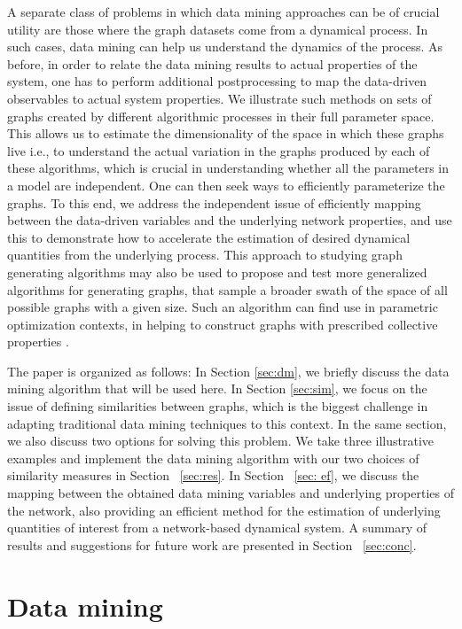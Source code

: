 A separate class of problems in which data mining approaches can be of
crucial utility are those where the graph datasets come from a
dynamical process. In such cases, data mining can help us understand
the dynamics of the process. As before, in order to relate the data
mining results to actual properties of the system, one has to perform
additional postprocessing to map the data-driven observables to actual
system properties.
% 
We illustrate such methods on sets of graphs created by different
algorithmic processes in their full parameter space. This allows us to
estimate the dimensionality of the space in which these graphs live
i.e., to understand the actual variation in the graphs produced by
each of these algorithms, which is crucial in understanding whether
all the parameters in a model are independent.
% 
One can then seek ways to efficiently parameterize the graphs. To this
end, we address the independent issue of efficiently mapping between
the data-driven variables and the underlying network properties, and
use this to demonstrate how to accelerate the estimation of desired
dynamical quantities from the underlying process. This approach to
studying graph generating algorithms may also be used to propose and
test more generalized algorithms for generating graphs, that sample a
broader swath of the space of all possible graphs with a given
size. Such an algorithm can find use in parametric optimization
contexts, in helping to construct graphs with prescribed collective
properties \cite{Goun11generation}.

The paper is organized as follows: In Section \ref{sec:dm}, we briefly
discuss the data mining algorithm that will be used here. In Section
\ref{sec:sim}, we focus on the issue of defining similarities between
graphs, which is the biggest challenge in adapting traditional data
mining techniques to this context. In the same section, we also
discuss two options for solving this problem. We take three
illustrative examples and implement the data mining algorithm with our
two choices of similarity measures in Section ~\ref{sec:res}. In
Section ~\ref{sec: ef}, we discuss the mapping between the obtained
data mining variables and underlying properties of the network, also
providing an efficient method for the estimation of underlying
quantities of interest from a network-based dynamical system. A
summary of results and suggestions for future work are presented in
Section ~\ref{sec:conc}.

\section{\label{sec:dm}Data mining}


